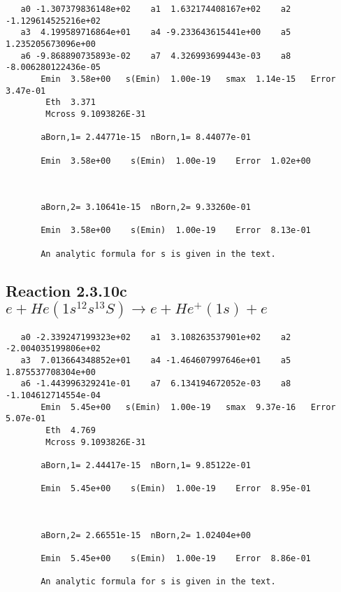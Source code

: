 \documentclass[12pt,dvipdfmx]{article}
\begin{document}
\begin{small}\begin{verbatim}
   a0 -1.307379836148e+02    a1  1.632174408167e+02    a2 -1.129614525216e+02
   a3  4.199589716864e+01    a4 -9.233643615441e+00    a5  1.235205673096e+00
   a6 -9.868890735893e-02    a7  4.326993699443e-03    a8 -8.006280122436e-05
       Emin  3.58e+00   s(Emin)  1.00e-19   smax  1.14e-15   Error  3.47e-01
        Eth  3.371
        Mcross 9.1093826E-31

       aBorn,1= 2.44771e-15  nBorn,1= 8.44077e-01

       Emin  3.58e+00    s(Emin)  1.00e-19    Error  1.02e+00



       aBorn,2= 3.10641e-15  nBorn,2= 9.33260e-01

       Emin  3.58e+00    s(Emin)  1.00e-19    Error  8.13e-01

       An analytic formula for s is given in the text.
\end{verbatim}\end{small}




\newpage
\subsection{
Reaction 2.3.10c $e + He(1s^12s^13S) \rightarrow e + He^+(1s) + e$}

















\begin{small}\begin{verbatim}
   a0 -2.339247199323e+02    a1  3.108263537901e+02    a2 -2.004035199806e+02
   a3  7.013664348852e+01    a4 -1.464607997646e+01    a5  1.875537708304e+00
   a6 -1.443996329241e-01    a7  6.134194672052e-03    a8 -1.104612714554e-04
       Emin  5.45e+00   s(Emin)  1.00e-19   smax  9.37e-16   Error  5.07e-01
        Eth  4.769
        Mcross 9.1093826E-31

       aBorn,1= 2.44417e-15  nBorn,1= 9.85122e-01

       Emin  5.45e+00    s(Emin)  1.00e-19    Error  8.95e-01



       aBorn,2= 2.66551e-15  nBorn,2= 1.02404e+00

       Emin  5.45e+00    s(Emin)  1.00e-19    Error  8.86e-01

       An analytic formula for s is given in the text.
\end{verbatim}\end{small}
\end{document}
